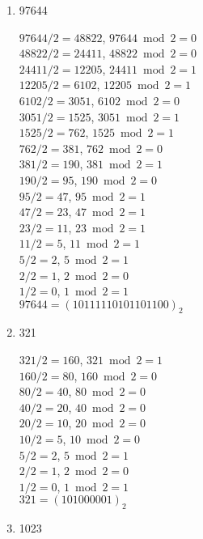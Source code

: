 \documentclass[11pt]{article}
\begin{document}
\begin{enumerate}[label=\textbf{\arabic*.}]
\begin{enumerate}[label=\textbf{\alph*)}]
		\item 97644
		
		$97644 / 2 = 48822$, $97644 \bmod 2 = 0$ \\
		$48822 / 2 = 24411$, $48822 \bmod 2 = 0$ \\
		$24411 / 2 = 12205$, $24411 \bmod 2 = 1$ \\
		$12205 / 2 = 6102$, $12205 \bmod 2 = 1$ \\
		$6102 / 2 = 3051$, $6102 \bmod 2 = 0$ \\
		$3051 / 2 = 1525$, $3051 \bmod 2 = 1$ \\
		$1525 / 2 = 762$, $1525 \bmod 2 = 1$ \\
		$762 / 2 = 381$, $762 \bmod 2 = 0$ \\
		$381 / 2 = 190$, $381 \bmod 2 = 1$ \\
		$190 / 2 = 95$, $190 \bmod 2 = 0$ \\
		$95 / 2 = 47$, $95 \bmod 2 = 1$ \\
		$47 / 2 = 23$, $47 \bmod 2 = 1$ \\
		$23 / 2 = 11$, $23 \bmod 2 = 1$ \\
		$11 / 2 = 5$, $11 \bmod 2 = 1$ \\
		$5 / 2 = 2$, $5 \bmod 2 = 1$ \\
		$2 / 2 = 1$, $2 \bmod 2 = 0$ \\
		$1 / 2 = 0$, $1 \bmod 2 = 1$ \\
		
		$97644 = (10111110101101100)_2$
		
		\pagebreak
		\item 321
		
		$321 / 2 = 160$, $321 \bmod 2 = 1$ \\
		$160 / 2 = 80$, $160 \bmod 2 = 0$ \\
		$80 / 2 = 40$, $80 \bmod 2 = 0$ \\
		$40 / 2 = 20$, $40 \bmod 2 = 0$ \\
		$20 / 2 = 10$, $20 \bmod 2 = 0$ \\
		$10 / 2 = 5$, $10 \bmod 2 = 0$ \\
		$5 / 2 = 2$, $5 \bmod 2 = 1$ \\
		$2 / 2 = 1$, $2 \bmod 2 = 0$ \\
		$1 / 2 = 0$, $1 \bmod 2 = 1$ \\
		
		$321 = (101000001)_2$
		
		\item 1023
		

\end{enumerate}
\end{enumerate}
\end{document}
